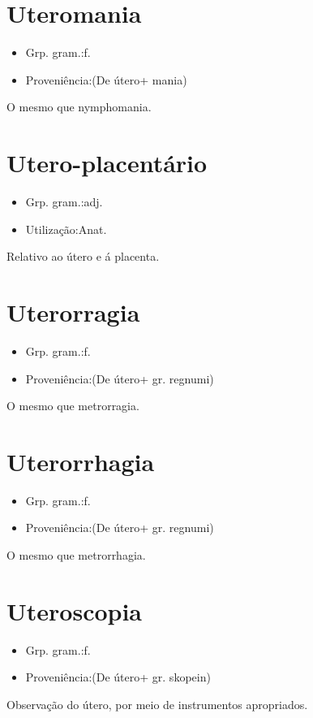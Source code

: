 \documentclass{article}
\begin{document}
\section{Uteromania}
\begin{itemize}
\item {Grp. gram.:f.}
\end{itemize}
\begin{itemize}
\item {Proveniência:(De \textunderscore útero\textunderscore  + \textunderscore mania\textunderscore )}
\end{itemize}
O mesmo que \textunderscore nymphomania\textunderscore .
\section{Utero-placentário}
\begin{itemize}
\item {Grp. gram.:adj.}
\end{itemize}
\begin{itemize}
\item {Utilização:Anat.}
\end{itemize}
Relativo ao útero e á placenta.
\section{Uterorragia}
\begin{itemize}
\item {Grp. gram.:f.}
\end{itemize}
\begin{itemize}
\item {Proveniência:(De \textunderscore útero\textunderscore  + gr. \textunderscore regnumi\textunderscore )}
\end{itemize}
O mesmo que \textunderscore metrorragia\textunderscore .
\section{Uterorrhagia}
\begin{itemize}
\item {Grp. gram.:f.}
\end{itemize}
\begin{itemize}
\item {Proveniência:(De \textunderscore útero\textunderscore  + gr. \textunderscore regnumi\textunderscore )}
\end{itemize}
O mesmo que \textunderscore metrorrhagia\textunderscore .
\section{Uteroscopia}
\begin{itemize}
\item {Grp. gram.:f.}
\end{itemize}
\begin{itemize}
\item {Proveniência:(De \textunderscore útero\textunderscore  + gr. \textunderscore skopein\textunderscore )}
\end{itemize}
Observação do útero, por meio de instrumentos apropriados.
\end{document}
